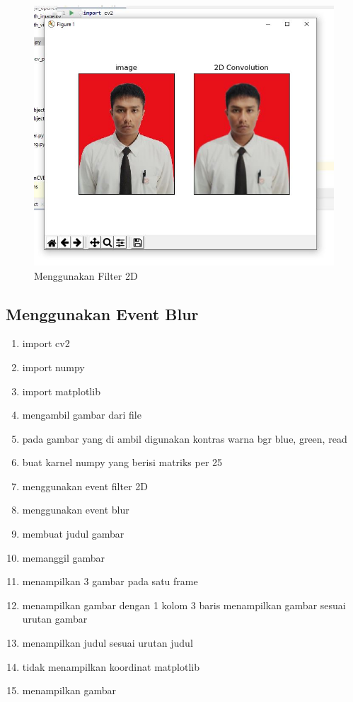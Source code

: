 \begin{figure}[ht]
\centering
\includegraphics[scale=0.6]{figures/2,59.jpg}
\caption{Menggunakan Filter 2D}
\label{contoh}
\end{figure}







\newpage
\subsection{Menggunakan Event Blur}

\begin{enumerate}
	\item import cv2
	\item import numpy
	\item import matplotlib
	\item mengambil gambar dari file
	\item pada gambar yang di ambil digunakan kontras warna bgr blue, green, read
	\item buat karnel numpy yang berisi matriks per 25
	\item menggunakan event filter 2D
	\item menggunakan event blur
	\item membuat judul gambar
	\item memanggil gambar
	\item menampilkan 3 gambar pada satu frame
	\item menampilkan gambar dengan 1 kolom 3 baris menampilkan gambar sesuai urutan gambar
	\item menampilkan judul sesuai urutan judul
	\item tidak menampilkan koordinat matplotlib
	\item menampilkan gambar
\end{enumerate}

